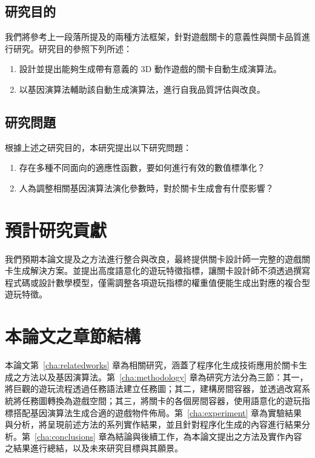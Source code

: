 \subsection{研究目的}

我們將參考上一段落所提及的兩種方法框架，針對遊戲關卡的意義性與關卡品質進行研究。研究目的參照下列所述：

\begin{enumerate}
  \setlength\itemsep{-0.5em}
  \item 設計並提出能夠生成帶有意義的 3D 動作遊戲的關卡自動生成演算法。
  \item 以基因演算法輔助該自動生成演算法，進行自我品質評估與改良。
\end{enumerate}

\subsection{研究問題}

根據上述之研究目的，本研究提出以下研究問題：

\begin{enumerate}
  \setlength\itemsep{-0.5em}
  \item 存在多種不同面向的適應性函數，要如何進行有效的數值標準化？
  \item 人為調整相關基因演算法演化參數時，對於關卡生成會有什麼影響？
\end{enumerate}

\section{預計研究貢獻}

我們預期本論文提及之方法進行整合與改良，最終提供關卡設計師一完整的遊戲關卡生成解決方案。並提出高度語意化的遊玩特徵指標，讓關卡設計師不須透過撰寫程式碼或設計數學模型，僅需調整各項遊玩指標的權重值便能生成出對應的複合型遊玩特徵。

\section{本論文之章節結構}

本論文第~\ref{cha:relatedworks} 章為相關研究，涵蓋了程序化生成技術應用於關卡生成之方法以及基因演算法。第~\ref{cha:methodology} 章為研究方法分為三節：其一，將巨觀的遊玩流程透過任務語法建立任務圖；其二，建構房間容器，並透過改寫系統將任務圖轉換為遊戲空間；其三，將關卡的各個房間容器，使用語意化的遊玩指標搭配基因演算法生成合適的遊戲物件佈局。第~\ref{cha:experiment} 章為實驗結果與分析，將呈現前述方法的系列實作結果，並且針對程序化生成的內容進行結果分析。第~\ref{cha:conclusions} 章為結論與後續工作，為本論文提出之方法及實作內容之結果進行總結，以及未來研究目標與其願景。